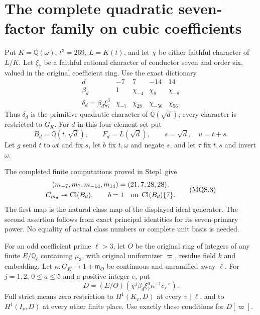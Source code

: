 \section{The complete quadratic seven-factor family on cubic coefficients}
\label{sec:mixed-cubic-quadratic-seven-strict}

Put $K=\mathbb Q(\omega)$, $t^3=269$, $L=K(t)$, and let $\chi$
be either faithful character of $L/K$.  Let $\xi_7$ be a faithful
rational character of conductor seven and order six, valued in the
original coefficient ring.  Use the exact dictionary
\[
 \begin{array}{c|rrrr}
  d&-7&7&-14&14\\\hline
  \beta_d&1&\chi_{-4}&\chi_8&\chi_{-8}\\
  \delta_d=\beta_d\xi_7^3&\chi_{-7}&\chi_{28}&\chi_{-56}&\chi_{56}.
 \end{array}
 \tag{MQS.1}
\]
Thus $\delta_d$ is the primitive quadratic character of
$\mathbb Q(\sqrt d)$; every character is restricted to $G_K$.
For $d$ in this four-element set put
\[
 B_d=\mathbb Q(t,\sqrt d),\qquad F_d=L(\sqrt d),\qquad
          s=\sqrt d,\quad u=t+s.
 \tag{MQS.2}
\]
Let $g$ send $t$ to $\omega t$ and fix $s$, let $b$ fix
$t,\omega$ and negate $s$, and let $\tau$ fix $t,s$ and
invert $\omega$.

The completed finite computations proved in Step1 give
\[
 \begin{gathered}
  (m_{-7},m_7,m_{-14},m_{14})=(21,7,28,28),\\
  C_{m_d}\twoheadrightarrow\operatorname{Cl}(B_d),\qquad
       b=1\quad\hbox{on }\operatorname{Cl}(B_d)\{7\}.
 \end{gathered}
 \tag{MQS.3}
\]
The first map is the natural class map of the displayed ideal
generator.  The second assertion follows from exact principal
identities for its seven-primary power.
No equality of actual class numbers or complete unit basis is needed.

For an odd coefficient prime $\ell>3$, let $O$ be the original
ring of integers of any finite $E/\mathbb Q_\ell$ containing
$\mu_3$, with original uniformizer $\varpi$, residue field $k$
and embedding.  Let $\kappa:G_K\to1+\mathfrak m_O$ be continuous
and unramified away $\ell$.  For $j=1,2$, $0\leq a\leq5$
and a positive integer $e$, put
\[
         D=(E/O)(\chi^j\beta_d\xi_7^a\kappa^{-1}c_\ell^{-e}).
 \tag{MQS.4}
\]
Full strict means zero restriction to $H^1(K_v,D)$ at every
$v\mid\ell$, and to $H^1(I_v,D)$ at every other finite place.
Use exactly these conditions for $D[\varpi]$.

